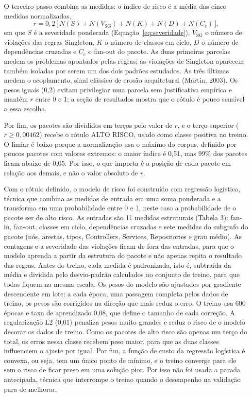 \documentclass[
  a4paper,
]{article}
\begin{document}
O terceiro passo combina as medidas: o índice de risco é a média das cinco medidas normalizadas,
\begin{equation}
  r = 0{,}2\,\bigl[\,N(S) + N(V_{\mathrm{SG}}) + N(K) + N(D) + N(C_e)\,\bigr],
  \label{eq:risco}
\end{equation}
em que $S$ é a severidade ponderada (Equação~\ref{eq:severidade}), $V_{\mathrm{SG}}$ o número de violações das regras Singleton, $K$ o número de classes em ciclo, $D$ o número de dependências cruzadas e $C_e$ o fan-out do pacote. As duas primeiras parcelas medem os problemas apontados pelas regras; as violações de Singleton aparecem também isoladas por serem um dos dois padrões estudados. As três últimas medem o acoplamento, sinal clássico de erosão arquitetural (Martin, 2003). Os pesos iguais (0,2) evitam privilegiar uma parcela sem justificativa empírica e mantêm $r$ entre 0 e 1; a seção de resultados mostra que o rótulo é pouco sensível a essa escolha.

Por fim, os pacotes são divididos em terços pelo valor de $r$, e o terço superior ($r \geq 0{,}00462$) recebe o rótulo ALTO RISCO, usado como classe positiva no treino. O limiar é baixo porque a normalização usa o máximo do corpus, definido por poucos pacotes com valores extremos: o maior índice é 0,51, mas 99\% dos pacotes ficam abaixo de 0,05. Por isso, o que importa é a posição de cada pacote em relação aos demais, e não o valor absoluto de $r$.

Com o rótulo definido, o modelo de risco foi construído com regressão logística, técnica que combina as medidas de entrada em uma soma ponderada e a transforma em uma probabilidade entre 0 e 1, neste caso a probabilidade de o pacote ser de alto risco. As entradas são 11 medidas estruturais (Tabela 3): fan-in, fan-out, classes em ciclo, dependências cruzadas e sete medidas do subgrafo do pacote (nós, arestas, tipos, Controllers, Services, Repositories e grau médio). As contagens e a severidade das violações ficam de fora das entradas, para que o modelo aprenda a partir da estrutura do pacote e não apenas repita o resultado das regras. Antes do treino, cada medida é padronizada, isto é, subtraída da média e dividida pelo desvio-padrão calculados no conjunto de treino, para que todas fiquem na mesma escala. Os pesos do modelo são ajustados por gradiente descendente em lote: a cada época, uma passagem completa pelos dados de treino, os pesos são corrigidos na direção que mais reduz o erro. O treino usa 600 épocas e taxa de aprendizado 0,08, que define o tamanho de cada correção. A regularização L2 (0,01) penaliza pesos muito grandes e reduz o risco de o modelo decorar os dados de treino. Como os pacotes de alto risco são apenas um terço do total, os erros nessa classe recebem peso maior, para que as duas classes influenciem o ajuste por igual. Por fim, a função de custo da regressão logística é convexa, ou seja, tem um único ponto de mínimo, e o treino converge para ele sem o risco de ficar preso em uma solução pior. Por isso não foi usada a parada antecipada, técnica que interrompe o treino quando o desempenho na validação para de melhorar.
\end{document}
